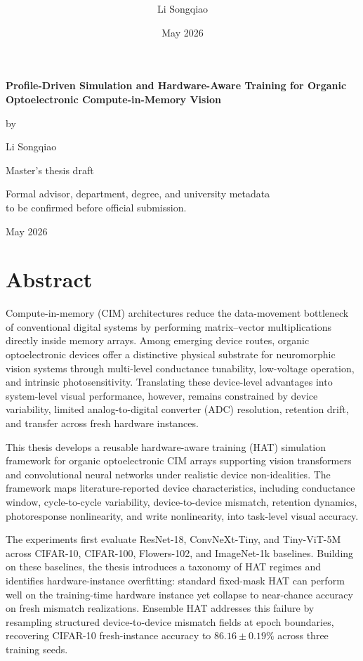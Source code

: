 \documentclass[12pt]{report}
\title{\textbf{\ThesisTitle}}
\author{Li Songqiao}
\date{May 2026}
\newcommand{\ThesisTitle}{Profile-Driven Simulation and Hardware-Aware Training for Organic Optoelectronic Compute-in-Memory Vision}
\begin{document}
\begin{titlepage}
    \centering
    \vspace*{2cm}
    {\Huge\bfseries \ThesisTitle\par}
    \vspace{2cm}
    {\LARGE by\par}
    \vspace{1cm}
    {\LARGE Li Songqiao\par}
    \vspace{2cm}
    {\Large Master's thesis draft\par}
    \vspace{2cm}
    {\Large Formal advisor, department, degree, and university metadata\\to be confirmed before official submission.\par}
    \vfill
    {\Large May 2026\par}
\end{titlepage}

\chapter*{Abstract}
Compute-in-memory (CIM) architectures reduce the data-movement bottleneck of conventional digital systems by performing matrix--vector multiplications directly inside memory arrays. Among emerging device routes, organic optoelectronic devices offer a distinctive physical substrate for neuromorphic vision systems through multi-level conductance tunability, low-voltage operation, and intrinsic photosensitivity. Translating these device-level advantages into system-level visual performance, however, remains constrained by device variability, limited analog-to-digital converter (ADC) resolution, retention drift, and transfer across fresh hardware instances.

This thesis develops a reusable hardware-aware training (HAT) simulation framework for organic optoelectronic CIM arrays supporting vision transformers and convolutional neural networks under realistic device non-idealities. The framework maps literature-reported device characteristics, including conductance window, cycle-to-cycle variability, device-to-device mismatch, retention dynamics, photoresponse nonlinearity, and write nonlinearity, into task-level visual accuracy.

The experiments first evaluate ResNet-18, ConvNeXt-Tiny, and Tiny-ViT-5M across CIFAR-10, CIFAR-100, Flowers-102, and ImageNet-1k baselines. Building on these baselines, the thesis introduces a taxonomy of HAT regimes and identifies hardware-instance overfitting: standard fixed-mask HAT can perform well on the training-time hardware instance yet collapse to near-chance accuracy on fresh mismatch realizations. Ensemble HAT addresses this failure by resampling structured device-to-device mismatch fields at epoch boundaries, recovering CIFAR-10 fresh-instance accuracy to \(86.16\pm0.19\%\) across three training seeds.
\end{document}
